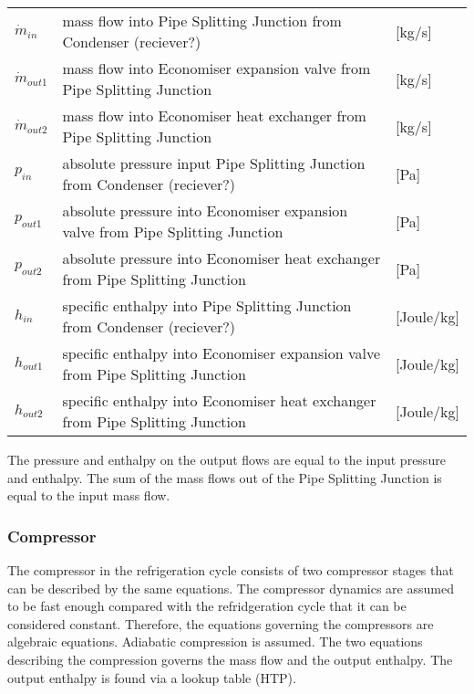 \begin{center}
	\begin{tabular}{l p{12cm} l}
		$\dot{m}_{in}$ 		& mass flow into Pipe Splitting Junction from Condenser (reciever?) 						& [\si{kg}/\si{s}]\\
		$\dot{m}_{out1}$ 	& mass flow into Economiser expansion valve from Pipe Splitting Junction 				& [\si{kg}/\si{s}]\\
		$\dot{m}_{out2}$ 	& mass flow into Economiser heat exchanger from Pipe Splitting Junction 					& [\si{kg}/\si{s}]\\
		$p_{in}$ 			& absolute pressure input Pipe Splitting Junction from Condenser (reciever?)		& [\si{Pa}]\\
		$p_{out1}$ 			& absolute pressure into Economiser expansion valve from Pipe Splitting Junction 	& [\si{Pa}]\\
		$p_{out2}$ 			& absolute pressure into Economiser heat exchanger from Pipe Splitting Junction 	& [\si{Pa}]\\
		$h_{in}$ 			& specific enthalpy into Pipe Splitting Junction from Condenser (reciever?)   		& [\si{Joule}/\si{kg}]\\ 
		$h_{out1}$ 			& specific enthalpy into Economiser expansion valve from Pipe Splitting Junction	& [\si{Joule}/\si{kg}]\\ 
		$h_{out2}$ 			& specific enthalpy into Economiser heat exchanger from Pipe Splitting Junction		& [\si{Joule}/\si{kg}]\\ 
	\end{tabular}
\end{center}


The pressure and enthalpy on the output flows are equal to the input pressure and enthalpy. The sum of the mass flows out of the Pipe Splitting Junction is equal to the input mass flow. \\

\subsubsection{Compressor}
The compressor in the refrigeration cycle consists of two compressor stages that can be described by the same equations.
The compressor dynamics are assumed to be fast enough compared with the refridgeration cycle that it can be considered constant. Therefore, the equations governing the compressors are algebraic equations. 
Adiabatic compression is assumed. 
The two equations describing the compression governs the mass flow and the output enthalpy. The output enthalpy is found via a lookup table (HTP). 

